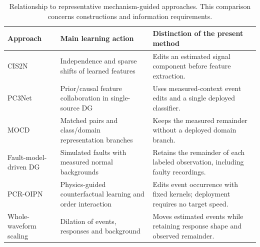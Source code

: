 \begin{table}[pos=htbp]
\centering\small
\caption{Relationship to representative mechanism-guided approaches. This comparison concerns constructions and information requirements.}
\label{tab:position}
\begin{tabular}{>{\raggedright\arraybackslash}p{.19\linewidth}>{\raggedright\arraybackslash}p{.34\linewidth}>{\raggedright\arraybackslash}p{.35\linewidth}}
\toprule
Approach & Main learning action & Distinction of the present method\\
\midrule
CIS2N \cite{cis2n} & Independence and sparse shifts of learned features & Edits an estimated signal component before feature extraction.\\
PC3Net \cite{pc3net} & Prior/causal feature collaboration in single-source DG & Uses measured-context event edits and a single deployed classifier.\\
MOCD \cite{mocd} & Matched pairs and class/domain representation branches & Keeps the measured remainder without a deployed domain branch.\\
Fault-model-driven DG \cite{pang2024} & Simulated faults with measured normal backgrounds & Retains the remainder of each labeled observation, including faulty recordings.\\
PCR-OIPN \cite{pcr2026} & Physics-guided counterfactual learning and order interaction & Edits event occurrence with fixed kernels; deployment requires no target speed.\\
Whole-waveform scaling & Dilation of events, responses and background & Moves estimated events while retaining response shape and observed remainder.\\
\bottomrule
\end{tabular}
\end{table}
